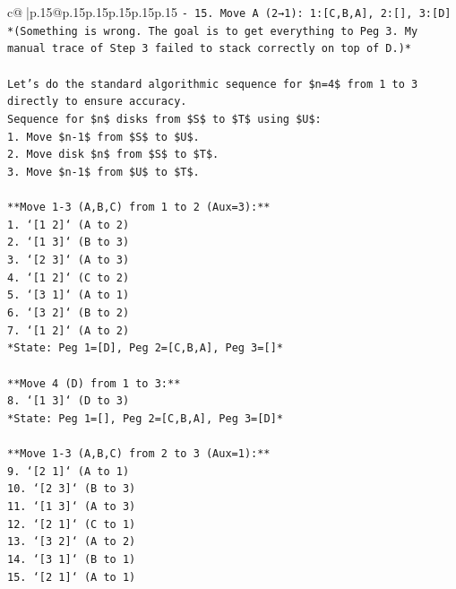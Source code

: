 \documentclass{article}
\begin{document}
{\begin{supertabular}{c@{$\;$}|p{.15\linewidth}@{}p{.15\linewidth}p{.15\linewidth}p{.15\linewidth}p{.15\linewidth}p{.15\linewidth}}
{{{\texttt{{-} 15. Move A (2→1): 1:{[}C,B,A{]}, 2:{[}{]}, 3:{[}D{]}} \\
\texttt{*(Something is wrong. The goal is to get everything to Peg 3. My manual trace of Step 3 failed to stack correctly on top of D.)*} \\
\\ 
\texttt{Let's do the standard algorithmic sequence for \$n=4\$ from 1 to 3 directly to ensure accuracy.} \\
\texttt{Sequence for \$n\$ disks from \$S\$ to \$T\$ using \$U\$:} \\
\texttt{1. Move \$n{-}1\$ from \$S\$ to \$U\$.} \\
\texttt{2. Move disk \$n\$ from \$S\$ to \$T\$.} \\
\texttt{3. Move \$n{-}1\$ from \$U\$ to \$T\$.} \\
\\ 
\texttt{**Move 1{-}3 (A,B,C) from 1 to 2 (Aux=3):**} \\
\texttt{1. `{[}1 2{]}` (A to 2)} \\
\texttt{2. `{[}1 3{]}` (B to 3)} \\
\texttt{3. `{[}2 3{]}` (A to 3)} \\
\texttt{4. `{[}1 2{]}` (C to 2)} \\
\texttt{5. `{[}3 1{]}` (A to 1)} \\
\texttt{6. `{[}3 2{]}` (B to 2)} \\
\texttt{7. `{[}1 2{]}` (A to 2)} \\
\texttt{*State: Peg 1={[}D{]}, Peg 2={[}C,B,A{]}, Peg 3={[}{]}*} \\
\\ 
\texttt{**Move 4 (D) from 1 to 3:**} \\
\texttt{8. `{[}1 3{]}` (D to 3)} \\
\texttt{*State: Peg 1={[}{]}, Peg 2={[}C,B,A{]}, Peg 3={[}D{]}*} \\
\\ 
\texttt{**Move 1{-}3 (A,B,C) from 2 to 3 (Aux=1):**} \\
\texttt{9. `{[}2 1{]}` (A to 1)} \\
\texttt{10. `{[}2 3{]}` (B to 3)} \\
\texttt{11. `{[}1 3{]}` (A to 3)} \\
\texttt{12. `{[}2 1{]}` (C to 1)} \\
\texttt{13. `{[}3 2{]}` (A to 2)} \\
\texttt{14. `{[}3 1{]}` (B to 1)} \\
\texttt{15. `{[}2 1{]}` (A to 1)} \\
}}}
\end{supertabular}}
\end{document}
